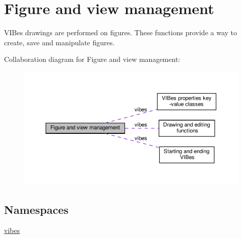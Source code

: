\hypertarget{group__figure}{}\section{Figure and view management}
\label{group__figure}


V\+I\+Bes drawings are performed on figures. These functions provide a way to create, save and manipulate figures.  


Collaboration diagram for Figure and view management\+:\nopagebreak
\begin{figure}[H]
\begin{center}
\leavevmode
\includegraphics[width=350pt]{group__figure}
\end{center}
\end{figure}
\subsection*{Namespaces}
\begin{DoxyCompactItemize}
\item 
 \hyperlink{namespacevibes}{vibes}
\end{DoxyCompactItemize}
